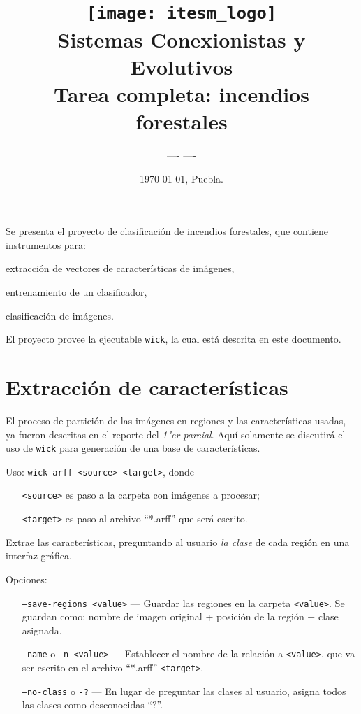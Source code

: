 \documentclass{article}
\title{ \texttt{[image: itesm\_logo]}
	    \\[4em] 
        Sistemas Conexionistas y Evolutivos
        \\[2em]
        Tarea completa: incendios forestales
        \\[1em]
        }
\author{ \vspace*{\fill} ---- \qquad\small ---- \\[1em] }
\date{ \vspace*{\fill} \today, Puebla.}
\begin{document}
\maketitle
\newpage

Se presenta el proyecto de clasificación de incendios forestales,
que contiene instrumentos para:
\begin{enumerate*}[1)]
\item extracción de vectores de características de imágenes,
\item entrenamiento de un clasificador,
\item clasificación de imágenes.
\end{enumerate*} 

El proyecto provee la ejecutable \verb|wick|, la cual está descrita en este documento.


\section{Extracción de características}
El proceso de partición de las imágenes en regiones y las características usadas, ya fueron descritas en el reporte del \emph{1"er parcial}.
Aquí solamente se discutirá el uso de \verb|wick| para generación de una base de características.

\medskip
\noindent
Uso: \verb|wick arff <source> <target>|, donde 
\begin{itemize}[leftmargin=9em]
\item[\texttt{<source>}] es paso a la carpeta con imágenes a procesar;
\item[\texttt{<target>}] es paso al archivo ``*.arff'' que será escrito.
\end{itemize}

Extrae las características, preguntando al usuario \emph{la clase} de cada región en
una interfaz gráfica.

\medskip
\noindent
Opciones:
\begin{itemize}[align=left]
\item[\texttt{--save-regions <value>}] --- Guardar las regiones en la carpeta \verb|<value>|.
                                           Se guardan como: nombre de imagen original +
                                           posición de la región + clase asignada.
\item[\texttt{--name} o \texttt{-n <value>}] --- Establecer el nombre de la relación a \verb|<value>|, que va ser escrito en el archivo  ``*.arff'' \verb|<target>|.
\item[\texttt{--no-class} o \texttt{-?}] --- En lugar de preguntar las clases al usuario, asigna todos las clases como desconocidas ``?''.
\end{itemize}
\end{document}

